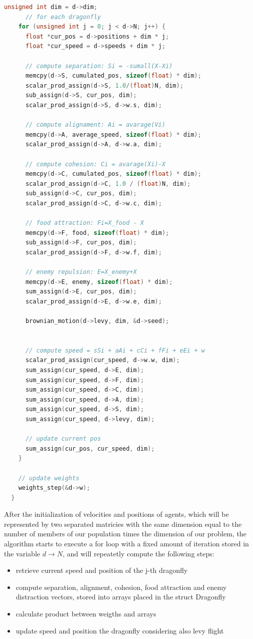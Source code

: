 \documentclass[10pt]{article}
\begin{document}
\begin{multicols}{2}
\begin{lstlisting}[language=C,caption={first implementation of the dragonfly algorithm}]
    unsigned int dim = d->dim;
      // for each dragonfly
    for (unsigned int j = 0; j < d->N; j++) {
      float *cur_pos = d->positions + dim * j;
      float *cur_speed = d->speeds + dim * j;

      // compute separation: Si = -sumall(X-Xi)
      memcpy(d->S, cumulated_pos, sizeof(float) * dim);
      scalar_prod_assign(d->S, 1.0/(float)N, dim);
      sub_assign(d->S, cur_pos, dim);
      scalar_prod_assign(d->S, d->w.s, dim);

      // compute alignament: Ai = avarage(Vi)
      memcpy(d->A, average_speed, sizeof(float) * dim);
      scalar_prod_assign(d->A, d->w.a, dim);

      // compute cohesion: Ci = avarage(Xi)-X
      memcpy(d->C, cumulated_pos, sizeof(float) * dim);
      scalar_prod_assign(d->C, 1.0 / (float)N, dim);
      sub_assign(d->C, cur_pos, dim);
      scalar_prod_assign(d->C, d->w.c, dim);

      // food attraction: Fi=X_food - X
      memcpy(d->F, food, sizeof(float) * dim);
      sub_assign(d->F, cur_pos, dim);
      scalar_prod_assign(d->F, d->w.f, dim);

      // enemy repulsion: E=X_enemy+X
      memcpy(d->E, enemy, sizeof(float) * dim);
      sum_assign(d->E, cur_pos, dim);
      scalar_prod_assign(d->E, d->w.e, dim);

      brownian_motion(d->levy, dim, &d->seed);


      // compute speed = sSi + aAi + cCi + fFi + eEi + w
      scalar_prod_assign(cur_speed, d->w.w, dim);
      sum_assign(cur_speed, d->E, dim);
      sum_assign(cur_speed, d->F, dim);
      sum_assign(cur_speed, d->C, dim);
      sum_assign(cur_speed, d->A, dim);
      sum_assign(cur_speed, d->S, dim);
      sum_assign(cur_speed, d->levy, dim);

      // update current pos
      sum_assign(cur_pos, cur_speed, dim);
    }

    // update weights
    weights_step(&d->w);
  }
\end{lstlisting}

\noindent After the initialization of velocities and positions of agents,
which will be represented by two separated matricies with the same dimension equal to the number of members of our
population times the dimension of our problem, the algorithm starts to execute a for loop with a fixed amount of iteration stored in the variable $d\rightarrow N$, 
and will repeatetly compute the following steps:
\begin{itemize}
  \item retrieve current speed and position of the j-th dragonfly
  \item compute separation, alignment, cohesion, food attraction and enemy distraction vectors,
  stored into arrays placed in the struct Dragonfly
  \item calculate product between weigths and arrays
  \item update speed and position the dragonfly considering also levy flight
\end{itemize}

\end{multicols}
\end{document}

